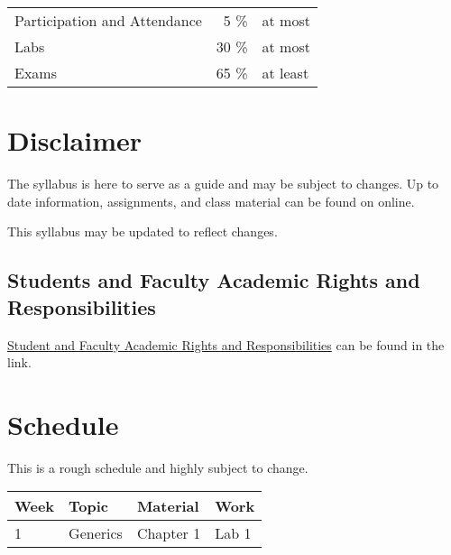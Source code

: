 \documentclass[10pt, letter]{article}
\begin{document}
\begin{tabular}{ l  r l}
	Participation and Attendance & 5 \% & at most \\
	Labs & 30 \% & at most \\
	Exams & 65 \% & at least \\
\end{tabular}


\section*{Disclaimer}
The syllabus is here to serve as a guide and may be subject to changes.  Up to date information, assignments, and class material can be found on online.

This syllabus may be updated to reflect changes.


\subsection*{Students and Faculty Academic Rights and Responsibilities}
\href{http://policies.temple.edu/PDF/99.pdf}{Student and Faculty Academic Rights and Responsibilities} can be found in the link.

\section{Schedule} 
This is a rough schedule and highly subject to change.


\begin{tabular}{ | l | l | l | l |}
	\hline
	Week & Topic & Material & Work   \\ \hline
	1    & Generics & Chapter 1 & Lab 1 \\ \hline
	
	
\end{tabular}
\end{document}
